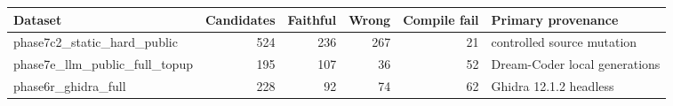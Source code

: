 \begin{tabular}{lrrrrl}
\toprule
Dataset & Candidates & Faithful & Wrong & Compile fail & Primary provenance \\
\midrule
phase7c2\_static\_hard\_public & 524 & 236 & 267 & 21 & controlled source mutation \\
phase7e\_llm\_public\_full\_topup & 195 & 107 & 36 & 52 & Dream-Coder local generations \\
phase6r\_ghidra\_full & 228 & 92 & 74 & 62 & Ghidra 12.1.2 headless \\
\bottomrule
\end{tabular}


